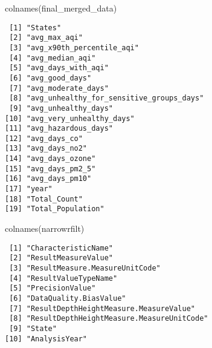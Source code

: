 \documentclass[
  12pt,
]{article}
\newenvironment{Shaded}{\begin{snugshade}}{\end{snugshade}}
\newcommand{\FunctionTok}[1]{\textcolor[rgb]{0.28,0.35,0.67}{#1}}
\newcommand{\NormalTok}[1]{\textcolor[rgb]{0.00,0.23,0.31}{#1}}
\begin{document}
\begin{Shaded}
\begin{Highlighting}[]
\FunctionTok{colnames}\NormalTok{(final\_merged\_data)}
\end{Highlighting}
\end{Shaded}

\begin{verbatim}
 [1] "States"                                 
 [2] "avg_max_aqi"                            
 [3] "avg_x90th_percentile_aqi"               
 [4] "avg_median_aqi"                         
 [5] "avg_days_with_aqi"                      
 [6] "avg_good_days"                          
 [7] "avg_moderate_days"                      
 [8] "avg_unhealthy_for_sensitive_groups_days"
 [9] "avg_unhealthy_days"                     
[10] "avg_very_unhealthy_days"                
[11] "avg_hazardous_days"                     
[12] "avg_days_co"                            
[13] "avg_days_no2"                           
[14] "avg_days_ozone"                         
[15] "avg_days_pm2_5"                         
[16] "avg_days_pm10"                          
[17] "year"                                   
[18] "Total_Count"                            
[19] "Total_Population"                       
\end{verbatim}

\begin{Shaded}
\begin{Highlighting}[]
\FunctionTok{colnames}\NormalTok{(narrowrfilt)}
\end{Highlighting}
\end{Shaded}

\begin{verbatim}
 [1] "CharacteristicName"                      
 [2] "ResultMeasureValue"                      
 [3] "ResultMeasure.MeasureUnitCode"           
 [4] "ResultValueTypeName"                     
 [5] "PrecisionValue"                          
 [6] "DataQuality.BiasValue"                   
 [7] "ResultDepthHeightMeasure.MeasureValue"   
 [8] "ResultDepthHeightMeasure.MeasureUnitCode"
 [9] "State"                                   
[10] "AnalysisYear"                            
\end{verbatim}
\end{document}

